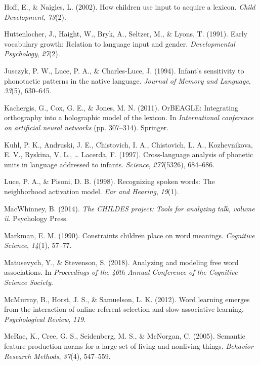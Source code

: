 \documentclass[english,floatsintext,man]{apa6}
\theoremstyle{definition}
\theoremstyle{definition}
\theoremstyle{definition}
\theoremstyle{remark}
\begin{document}
\hypertarget{ref-hoff2002}{}
Hoff, E., \& Naigles, L. (2002). How children use input to acquire a
lexicon. \emph{Child Development}, \emph{73}(2).

\hypertarget{ref-huttenlocher1991}{}
Huttenlocher, J., Haight, W., Bryk, A., Seltzer, M., \& Lyons, T.
(1991). Early vocabulary growth: Relation to language input and gender.
\emph{Developmental Psychology}, \emph{27}(2).

\hypertarget{ref-jusczyk1994}{}
Jusczyk, P. W., Luce, P. A., \& Charles-Luce, J. (1994). Infant's
sensitivity to phonotactic patterns in the native language.
\emph{Journal of Memory and Language}, \emph{33}(5), 630--645.

\hypertarget{ref-kachergis2011}{}
Kachergis, G., Cox, G. E., \& Jones, M. N. (2011). OrBEAGLE: Integrating
orthography into a holographic model of the lexicon. In
\emph{International conference on artificial neural networks} (pp.
307--314). Springer.

\hypertarget{ref-kuhl1997}{}
Kuhl, P. K., Andruski, J. E., Chistovich, I. A., Chistovich, L. A.,
Kozhevnikova, E. V., Ryskina, V. L., \ldots{} Lacerda, F. (1997).
Cross-language analysis of phonetic units in language addressed to
infants. \emph{Science}, \emph{277}(5326), 684--686.

\hypertarget{ref-luce1998}{}
Luce, P. A., \& Pisoni, D. B. (1998). Recognizing spoken words: The
neighborhood activation model. \emph{Ear and Hearing}, \emph{19}(1).

\hypertarget{ref-macwhinney2014}{}
MacWhinney, B. (2014). \emph{The CHILDES project: Tools for analyzing
talk, volume ii}. Psychology Press.

\hypertarget{ref-markman90}{}
Markman, E. M. (1990). Constraints children place on word meanings.
\emph{Cognitive Science}, \emph{14}(1), 57--77.

\hypertarget{ref-matusevych2018}{}
Matusevych, Y., \& Stevenson, S. (2018). Analyzing and modeling free
word associations. In \emph{Proceedings of the 40th Annual Conference of
the Cognitive Science Society}.

\hypertarget{ref-mcmurray2012}{}
McMurray, B., Horst, J. S., \& Samuelson, L. K. (2012). Word learning
emerges from the interaction of online referent selection and slow
associative learning. \emph{Psychological Review}, \emph{119}.

\hypertarget{ref-mcrae2005}{}
McRae, K., Cree, G. S., Seidenberg, M. S., \& McNorgan, C. (2005).
Semantic feature production norms for a large set of living and
nonliving things. \emph{Behavior Research Methods}, \emph{37}(4),
547--559.
\end{document}
